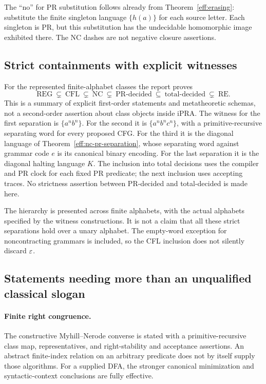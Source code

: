 The ``no'' for PR substitution follows already from
Theorem~\ref{eff:erasing}: substitute the finite singleton language
$\{h(a)\}$ for each source letter. Each singleton is PR, but this
substitution has the undecidable homomorphic image exhibited there.
The NC dashes are not negative closure assertions.

\subsection{Strict containments with explicit witnesses}

For the represented finite-alphabet classes the report proves
\[
 \mathrm{REG}\ \subsetneq\ \mathrm{CFL}\ \subsetneq\
 \mathrm{NC}\ \subsetneq\ \mathrm{PR\mbox{-}decided}
 \ \subseteq\ \mathrm{total\mbox{-}decided}
 \ \subsetneq\ \mathrm{RE}.
\]
This is a summary of explicit first-order statements and metatheoretic
schemas, not a second-order assertion about class objects inside iPRA.
The witness for the first separation is $\{a^nb^n\}$.
For the second it is $\{a^nb^nc^n\}$, with a primitive-recursive
separating word for every proposed CFG. For the third it is the diagonal
language of Theorem~\ref{eff:nc-pr-separation}, whose separating word
against grammar code $e$ is its canonical binary encoding.
For the last separation it is the diagonal halting language $K$.
The inclusion into total decisions uses the compiler and PR clock for
each fixed PR predicate; the next inclusion uses accepting traces.
No strictness assertion between PR-decided and total-decided is made here.

The hierarchy is presented across finite alphabets, with the actual
alphabets specified by the witness constructions. It is not a claim that
all these strict separations hold over a unary alphabet. The empty-word
exception for noncontracting grammars is included, so the CFL inclusion
does not silently discard $\varepsilon$.

\subsection{Statements needing more than an unqualified classical slogan}

\paragraph{Finite right congruence.}
The constructive Myhill--Nerode converse is stated with a primitive-recursive
class map, representatives, and right-stability and acceptance assertions.
An abstract finite-index relation on an arbitrary predicate does not by
itself supply those algorithms. For a supplied DFA, the stronger canonical
minimization and syntactic-context conclusions are fully effective.

